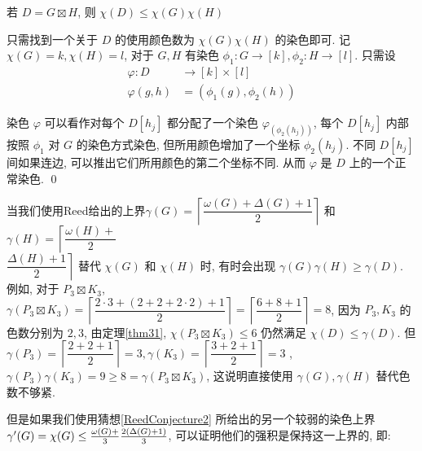 \documentclass[12pt,a4paper]{article}%
\begin{document}
\begin{thm}\label{thm31}
    若 $D = G \boxtimes H$, 则 $\chi(D) \leq \chi(G)\chi(H)$
\end{thm}
\begin{pf}
    只需找到一个关于 $D$ 的使用颜色数为 $\chi(G)\chi(H)$ 的染色即可. 记$\chi(G)=k, \chi(H)=l$, 对于 $G,H$ 有染色 $\phi_1 :G \rightarrow [k], \phi_2 :H \rightarrow [l]$. 只需设 
    \begin{equation*}
    \begin{aligned}
        \varphi :D &\rightarrow [k]\times[l]\\
        \varphi(g,h) &= (\phi_1(g),\phi_2(h))
    \end{aligned}
    \label{map2}
    \end{equation*}

    染色 $\varphi$ 可以看作对每个 $D[h_j]$ 都分配了一个染色 $\varphi_{(\phi_2(h_j))}$, 每个 $D[h_j]$ 内部按照 $\phi_1$ 对 $G$ 的染色方式染色, 但所用颜色增加了一个坐标 $\phi_2(h_j)$. 不同 $D[h_j]$ 间如果连边, 可以推出它们所用颜色的第二个坐标不同. 从而 $\varphi$ 是 $D$ 上的一个正常染色. \qed
\end{pf}


当我们使用Reed给出的上界$\gamma(G) = \left\lceil \dfrac{\omega (G) + \Delta (G) + 1}{2} \right\rceil$ 和 $\gamma(H) = \left\lceil \dfrac{\omega (H) +}{2} \right.$ \\
$\left. \dfrac{ \Delta (H) + 1}{2}\right\rceil$ 替代 $\chi(G)$ 和 $\chi(H)$ 时, 有时会出现 $\gamma(G)\gamma(H) \geq \gamma(D)$. 例如, 对于 $P_3\boxtimes K_3$, $\gamma(P_3\boxtimes K_3) = \left\lceil \dfrac{2·3 + (2+2+2·2) + 1}{2} \right\rceil = \left\lceil \dfrac{6 + 8 + 1}{2} \right\rceil = 8$, 因为 $P_3,K_3$ 的色数分别为 $2, 3$, 由定理\ref{thm31}, $\chi(P_3 \boxtimes K_3) \leq 6$ 仍然满足 $\chi(D) \leq \gamma(D)$. 但 $\gamma(P_3) = \left\lceil \dfrac{2 + 2 + 1}{2} \right\rceil = 3, \gamma(K_3) = \left\lceil \dfrac{3 + 2 + 1}{2} \right\rceil = 3$ , $\gamma(P_3)\gamma(K_3) = 9 \geq 8 = \gamma(P_3 \boxtimes K_3)$, 这说明直接使用 $\gamma(G),\gamma(H)$ 替代色数不够紧.


但是如果我们使用猜想\ref{ReedConjecture2} 所给出的另一个较弱的染色上界 $\gamma'(G) = \chi(G) \leq \frac{\omega(G) + }{3} \\ \frac{2(\Delta(G) + 1)}{3}$, 可以证明他们的强积是保持这一上界的, 即:
\end{document}
